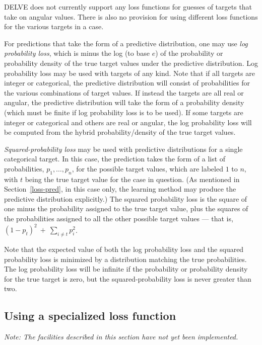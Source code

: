 DELVE does not currently support any loss functions for guesses of
targets that take on angular values.  There is also no provision for
using different loss functions for the various targets in a case.

For predictions that take the form of a predictive distribution, one
may use {\em log probability loss}, which is minus the log (to base
$e$) of the probability or probability density of the true target
values under the predictive distribution.  Log probability loss may be
used with targets of any kind.  Note that if all targets are integer
or categorical, the predictive distribution will consist of
probabilities for the various combinations of target values.  If
instead the targets are all real or angular, the predictive
distribution will take the form of a probability density (which must
be finite if log probability loss is to be used).  If some targets are
integer or categorical and others are real or angular, the log
probability loss will be computed from the hybrid probability/density
of the true target values.

{\em Squared-probability loss\/} may be used with predictive
distributions for a single categorical target.  In this case, the
prediction takes the form of a list of probabilities, $p_1, \ldots,
p_n$, for the possible target values, which are labeled $1$ to $n$,
with $t$ being the true target value for the case in question.  (As
mentioned in Section~\ref{loss-pred}, in this case only, the learning
method may produce the predictive distribution explicitly.)  The
squared probability loss is the square of one minus the probability
assigned to the true target value, plus the squares of the
probabilities assigned to all the other possible target values ---
that is, $(1\!-\!p_t)^2\ +\ \sum\limits_{i\ne t}p_i^2$.\vspace{-3pt}

Note that the expected value of both the log probability loss and the
squared probability loss is minimized by a distribution matching the
true probabilities.  The log probability loss will be infinite if
the probability or probability density for the true target is zero,
but the squared-probability loss is never greater than two.


\subsection{Using a specialized loss function}\label{loss-specialized}

{\em Note: The facilities described in this section have not yet been
implemented.}

